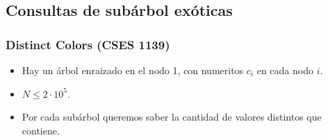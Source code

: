 \subsection{Consultas de subárbol exóticas}

\begin{frame}
  \frametitle{Distinct Colors (CSES 1139)}

  \begin{itemize}
    \item Hay un árbol enraizado en el nodo 1, con numeritos \(c_i\) en cada nodo \(i\).
    \item \(N \le 2 \cdot 10^5\).
    \item Por cada subárbol queremos saber la cantidad de valores distintos que contiene.
  \end{itemize}
\end{frame}
